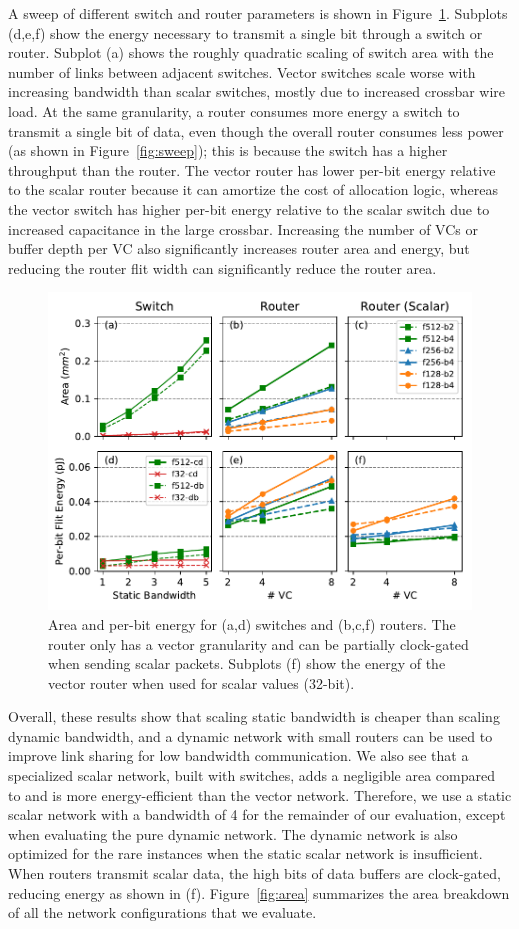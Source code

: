 A sweep of different switch and router parameters is shown in Figure~\ref{fig:char}. Subplots (d,e,f) show the energy necessary to transmit a single bit through a switch or router.
Subplot (a) shows the roughly quadratic scaling of switch area with the number of links between adjacent switches.
Vector switches scale worse with increasing bandwidth than scalar switches, mostly due to increased crossbar wire load. 
At the same granularity, a router consumes more energy a switch to transmit a single bit of data, even though the overall router consumes less power (as shown in Figure~\ref{fig:sweep}); 
this is because the switch has a higher throughput than the router.
The vector router has lower per-bit energy relative to the scalar router because it can amortize the cost of allocation logic, whereas the vector switch has higher per-bit energy relative to the scalar switch due to increased capacitance in the large crossbar. 
Increasing the number of VCs or buffer depth per VC also significantly increases router area and energy, but reducing the router flit width can significantly reduce the router area. 

\begin{figure}
\centering
\includegraphics[width=0.8\columnwidth]{network/figs/char.pdf}
  \caption[Area and per-bit energy for switches and routers]{Area and per-bit energy for (a,d) switches and (b,c,f) routers. 
  The router only has a vector granularity and can be partially clock-gated when sending scalar packets.
  Subplots (f) show the energy of the vector router when used for scalar values (32-bit).}\label{fig:char}
\end{figure}

Overall, these results show that scaling static bandwidth is cheaper than scaling dynamic bandwidth, and a dynamic network with small routers can be used to improve link sharing for low bandwidth communication.  
We also see that a specialized scalar network, built with switches, adds a negligible area compared to and is more energy-efficient than the vector network. 
Therefore, we use a static scalar network with a bandwidth of 4 for the remainder of our evaluation, except when evaluating the pure dynamic network.
The dynamic network is also optimized for the rare instances when the static scalar network is insufficient. 
When routers transmit scalar data, the high bits of data buffers are clock-gated, reducing energy as shown in (f).
Figure~\ref{fig:area} summarizes the area breakdown of all the network configurations that we evaluate.

